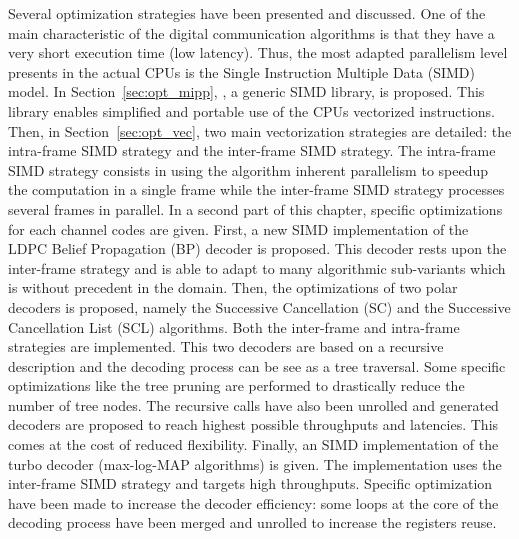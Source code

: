 Several optimization strategies have been presented and discussed. One of the
main characteristic of the digital communication algorithms is that they have a
very short execution time (low latency). Thus, the most adapted parallelism
level presents in the actual CPUs is the Single Instruction Multiple Data (SIMD)
model. In Section~\ref{sec:opt_mipp}, \MIPP, a generic SIMD library, is
proposed. This library enables simplified and portable use of the CPUs
vectorized instructions. Then, in Section~\ref{sec:opt_vec}, two main
vectorization strategies are detailed: the intra-frame SIMD strategy and the
inter-frame SIMD strategy. The intra-frame SIMD strategy consists in using the
algorithm inherent parallelism to speedup the computation in a single frame
while the inter-frame SIMD strategy processes several frames in parallel.
In a second part of this chapter, specific optimizations for each channel codes
are given. First, a new SIMD implementation of the LDPC Belief Propagation (BP)
decoder is proposed. This decoder rests upon the inter-frame strategy and is
able to adapt to many algorithmic sub-variants which is without precedent in the
domain. Then, the optimizations of two polar decoders is proposed, namely the
Successive Cancellation (SC) and the Successive Cancellation List (SCL)
algorithms. Both the inter-frame and intra-frame strategies are implemented.
This two decoders are based on a recursive description and the decoding process
can be see as a tree traversal. Some specific optimizations like the tree
pruning are performed to drastically reduce the number of tree nodes. The
recursive calls have also been unrolled and generated decoders are proposed to
reach highest possible throughputs and latencies. This comes at the cost of
reduced flexibility. Finally, an SIMD implementation of the turbo decoder
(max-log-MAP algorithms) is given. The implementation uses the inter-frame
SIMD strategy and targets high throughputs. Specific optimization have been made
to increase the decoder efficiency: some loops at the core of the decoding
process have been merged and unrolled to increase the registers reuse.

